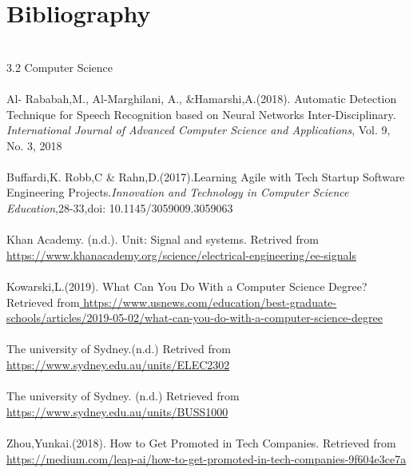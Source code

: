 \documentclass{article}
\begin{document}
	    
	\section{Bibliography}
	\\
	3.2 Computer Science\\
	\\
	Al- Rababah,M., Al-Marghilani, A., &Hamarshi,A.(2018). Automatic Detection Technique for Speech Recognition based on Neural Networks Inter-Disciplinary. \textit{International Journal of Advanced Computer Science and Applications}, Vol. 9, No. 3, 2018 \\
	\\
	Buffardi,K. Robb,C & Rahn,D.(2017).Learning Agile with Tech Startup Software Engineering Projects.\textit{Innovation and Technology in Computer Science Education},28-33,doi: 10.1145/3059009.3059063\\
	\\
	Khan Academy. (n.d.). Unit: Signal and systems. Retrived from\url{ https://www.khanacademy.org/science/electrical-engineering/ee-signals}\\
	\\
	Kowarski,L.(2019). What Can You Do With a Computer Science Degree? Retrieved from\url{ https://www.usnews.com/education/best-graduate-schools/articles/2019-05-02/what-can-you-do-with-a-computer-science-degree}\\
	\\
	The university of Sydney.(n.d.) Retrived from \url{
    https://www.sydney.edu.au/units/ELEC2302}\\
    \\
    The university of Sydney. (n.d.) Retrieved from \url{
    https://www.sydney.edu.au/units/BUSS1000}\\
    \\
    Zhou,Yunkai.(2018). How to Get Promoted in Tech Companies. Retrieved from \url{ https://medium.com/leap-ai/how-to-get-promoted-in-tech-companies-9f604e3ce7a}\\
    \\
    

	
\end{document}
